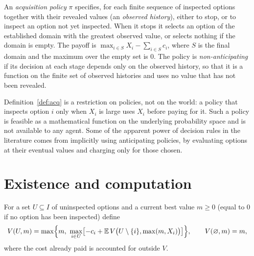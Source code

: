 \begin{definition}\label{def:acq}
An \emph{acquisition policy} $\pi$ specifies, for each finite sequence of inspected options together with their revealed values (an \emph{observed history}), either to stop, or to inspect an option not yet inspected. When it stops it selects an option of the established domain with the greatest observed value, or selects nothing if the domain is empty. The payoff is $\max_{i\in S}X_i-\sum_{i\in S}c_i$, where $S$ is the final domain and the maximum over the empty set is $0$. The policy is \emph{non-anticipating} if its decision at each stage depends only on the observed history, so that it is a function on the finite set of observed histories and uses no value that has not been revealed.
\end{definition}

Definition~\ref{def:acq} is a restriction on policies, not on the world: a policy that inspects option $i$ only when $X_i$ is large uses $X_i$ before paying for it. Such a policy is feasible as a mathematical function on the underlying probability space and is not available to any agent. Some of the apparent power of decision rules in the literature comes from implicitly using anticipating policies, by evaluating options at their eventual values and charging only for those chosen.

\section{Existence and computation}

For a set $U\subseteq I$ of uninspected options and a current best value $m\ge0$ (equal to $0$ if no option has been inspected) define
\[
V(U,m)=\max\Bigl\{m,\ \max_{i\in U}\bigl[-c_i+\mathbb E\,V\bigl(U\setminus\{i\},\max(m,X_i)\bigr)\bigr]\Bigr\},\qquad V(\varnothing,m)=m,
\]
where the cost already paid is accounted for outside $V$.

